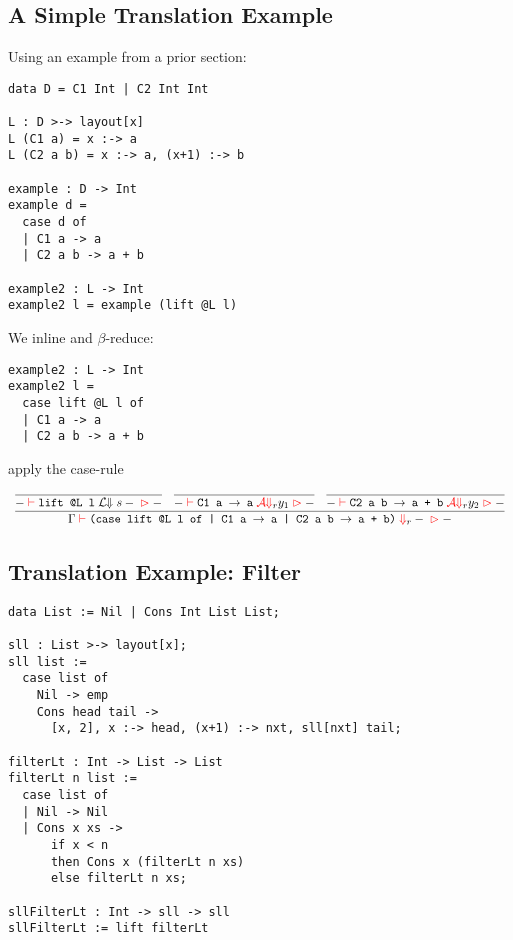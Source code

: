 \documentclass[10pt]{article}
\begin{document}
\subsection{A Simple Translation Example}

Using an example from a prior section:

\begin{lstlisting}
data D = C1 Int | C2 Int Int

L : D >-> layout[x]
L (C1 a) = x :-> a
L (C2 a b) = x :-> a, (x+1) :-> b

example : D -> Int
example d =
  case d of
  | C1 a -> a
  | C2 a b -> a + b

example2 : L -> Int
example2 l = example (lift @L l)
\end{lstlisting}

\noindent
We inline  and $\beta$-reduce:

\begin{lstlisting}
example2 : L -> Int
example2 l =
  case lift @L l of
  | C1 a -> a
  | C2 a b -> a + b
\end{lstlisting}

\noindent
apply the case-rule

\[
  \begin{array}{c}
    \infer{\Gamma \seq \ttt{(case lift @L l of | C1 a $\ra$ a | C2 a b $\ra$ a + b)}
      \bigs_r
        - \toCtx -}
      {\infer{- \seq \ttt{lift @L l} \Lbigs s - \toCtx -}{}
         & \infer{- \seq \ttt{C1 a $\ra$ a} \Abigs_r y_1 \toCtx -}{}
         & \infer{- \seq \ttt{C2 a b $\ra$ a + b} \Abigs_r y_2 \toCtx -}{}}
  \end{array}
\]

\subsection{Translation Example: Filter}

\begin{lstlisting}
data List := Nil | Cons Int List List;

sll : List >-> layout[x];
sll list :=
  case list of
    Nil -> emp
    Cons head tail ->
      [x, 2], x :-> head, (x+1) :-> nxt, sll[nxt] tail;

filterLt : Int -> List -> List
filterLt n list :=
  case list of
  | Nil -> Nil
  | Cons x xs ->
      if x < n
      then Cons x (filterLt n xs)
      else filterLt n xs;

sllFilterLt : Int -> sll -> sll
sllFilterLt := lift filterLt
\end{lstlisting}
\end{document}
